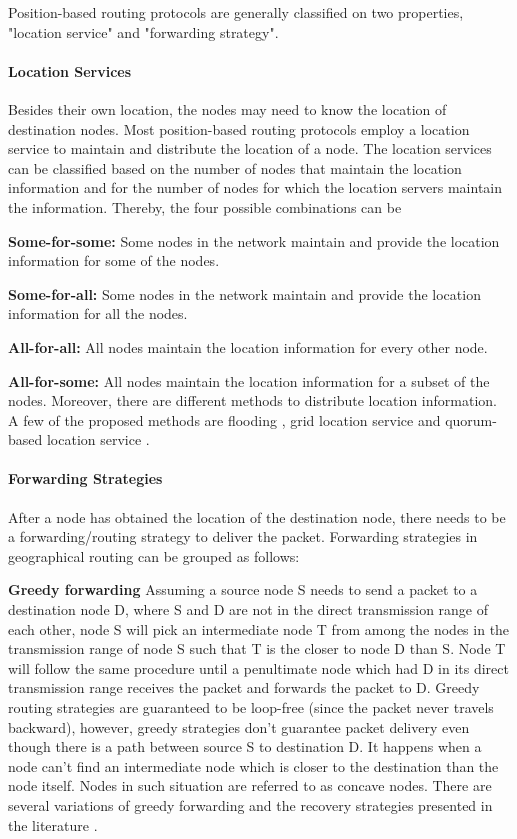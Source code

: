 Position-based routing protocols are generally classified on two properties, "location service" and "forwarding strategy".

\paragraph{Location Services} \label{loc_service}
Besides their own location, the nodes may need to know the location of destination nodes. Most position-based routing protocols employ a location service to maintain and distribute the location of a node. The location services can be classified based on the number of nodes that maintain the location information and for the number of nodes for which the location servers maintain the information. Thereby, the four possible combinations can be \cite{967595}

\textbf{Some-for-some:} Some nodes in the network maintain and provide the location information for some of the nodes.

\textbf{Some-for-all:} Some nodes in the network maintain and provide the location information for all the nodes.

\textbf{All-for-all:} All nodes maintain the location information for every other node.

\textbf{All-for-some:} All nodes maintain the location information for a subset of the nodes. 
Moreover, there are different methods to distribute location information. A few of the proposed methods are flooding \cite{Basagni:1998:DRE:288235.288254}, grid location service \cite{Li:2000:SLS:345910.345931} and quorum-based location service \cite{769770}.

\paragraph{Forwarding Strategies}
After a node has obtained the location of the destination node, there needs to be a forwarding/routing strategy to deliver the packet. Forwarding strategies in geographical routing can be grouped as follows:

\textbf{Greedy forwarding} Assuming a source node S needs to send a packet to a destination node D, where S and D are not in the direct transmission range of each other, node S will pick an intermediate node T from among the nodes in the transmission range of node S such that T is the closer to node D than S. Node T will follow the same procedure until a penultimate node which had D in its direct transmission range receives the packet and forwards the packet to D. 
Greedy routing strategies are guaranteed to be loop-free (since the packet never travels backward), however, greedy strategies don't guarantee packet delivery even though there is a path between source S to destination D. It happens when a node can't find an intermediate node which is closer to the destination than the node itself. Nodes in such situation are referred to as concave nodes. There are several variations of greedy forwarding and the recovery strategies presented in the literature \cite{OUBBATI201729} \cite{6238283} \cite{967595} \cite{Stojmenovic:2002:PRA:2288474.2290160}.

